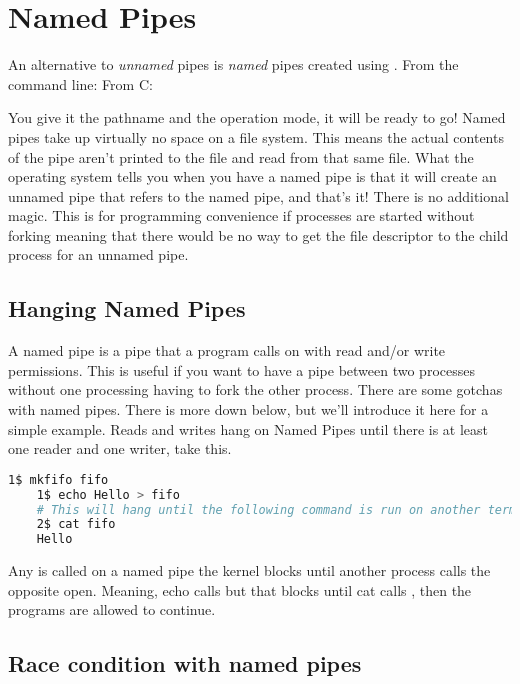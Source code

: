 \section{Named Pipes}
	 
An alternative to \emph{unnamed} pipes is \emph{named} pipes created using .
From the command line:  From C: 
	 
You give it the pathname and the operation mode, it will be ready to go!
Named pipes take up virtually no space on a file system.
This means the actual contents of the pipe aren't printed to the file and read from that same file.
What the operating system tells you when you have a named pipe is that it will create an unnamed pipe that refers to the named pipe, and that's it!
There is no additional magic.
This is for programming convenience if processes are started without forking meaning that there would be no way to get the file descriptor to the child process for an unnamed pipe.
	 
\subsection{Hanging Named Pipes}
	 
A named pipe  is a pipe that a program calls  on with read and/or write permissions.
This is useful if you want to have a pipe between two processes without one processing having to fork the other process.
There are some gotchas with named pipes.
There is more down below, but we'll introduce it here for a simple example.
Reads and writes hang on Named Pipes until there is at least one reader and one writer, take this.
	 
\begin{lstlisting}[language=bash]
	1$ mkfifo fifo
	1$ echo Hello > fifo
	# This will hang until the following command is run on another terminal or another process
	2$ cat fifo
	Hello
\end{lstlisting}
	 
Any  is called on a named pipe the kernel blocks until another process calls the opposite open. Meaning, echo calls  but that blocks until cat calls , then the programs are allowed to continue.
	 
\subsection{Race condition with named pipes}
	 

